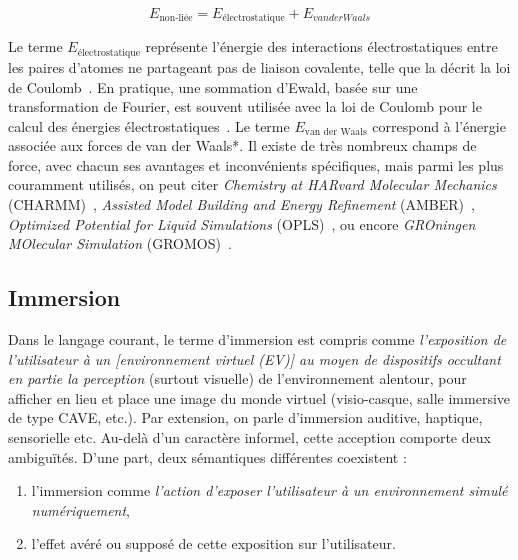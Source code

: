 \begin{appendices}
	\begin{equation}
		\label{eq:nonbonded}
		E_\text{non-liée} = E_\text{électrostatique} + E_{van der Waals}
	\end{equation}
	
	Le terme $E_\text{électrostatique}$ représente l'énergie des interactions électrostatiques entre les paires d'atomes ne partageant pas de liaison covalente, telle que la décrit la loi de Coulomb~\cite{coulomb1785premier}. En pratique, une sommation d'Ewald, basée sur une transformation de Fourier, est souvent utilisée avec la loi de Coulomb pour le calcul des énergies électrostatiques~\cite{ewald1921berechnung, essmann1995smooth}. Le terme $E_\text{van der Waals}$ correspond à l'énergie associée aux forces de van der Waals*. Il existe de très nombreux champs de force, avec chacun ses avantages et inconvénients spécifiques, mais parmi les plus couramment utilisés, on peut citer \emph{Chemistry at HARvard Molecular Mechanics} (CHARMM)~\cite{brooks1983charmm, brooks2009charmm}, \emph{Assisted Model Building and Energy Refinement} (AMBER)~\cite{cornell1995second, wang2004development}, \emph{Optimized Potential for Liquid Simulations} (OPLS)~\cite{jorgensen1996development, kaminski2001evaluation}, ou encore \emph{GROningen MOlecular Simulation} (GROMOS)~\cite{scott1999gromos, oostenbrink2004biomolecular}.
	
	\subsection{Immersion}
	\label{sub:immersion}

	\begin{displayquote}
		Dans le langage courant, le terme d'immersion est compris comme \emph{l'exposition de l'utilisateur à un [environnement virtuel (EV)] au moyen de dispositifs occultant en partie la perception} (surtout visuelle) de l'environnement alentour, pour afficher en lieu et place une image du monde virtuel (visio-casque, salle immersive de type CAVE, etc.). Par extension, on parle d'immersion auditive, haptique, sensorielle etc. Au-delà d'un caractère informel, cette acception comporte deux ambiguïtés. D'une part, deux sémantiques différentes coexistent :
	    \begin{enumerate}
	        \item l'immersion comme \emph{l'action d'exposer l'utilisateur à un environnement simulé numériquement},
	        \item l'effet avéré ou supposé de cette exposition sur l'utilisateur.
	    \end{enumerate}
	    

\end{displayquote}
\end{appendices}
